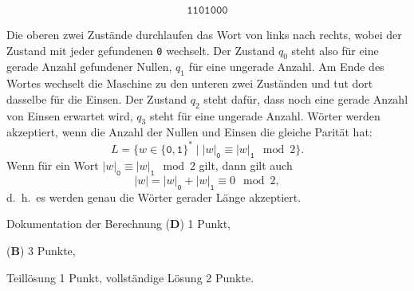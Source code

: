 \begin{loesung}
\begin{teilaufgaben}
\begin{align*}
{\texttt{1101000}
}
\end{align*}
\item
Die oberen zwei Zustände durchlaufen das Wort von links nach rechts,
wobei der Zustand mit jeder gefundenen \texttt{0} wechselt.
Der Zustand $q_0$ steht also für eine gerade Anzahl gefundener Nullen,
$q_1$ für eine ungerade Anzahl.
Am Ende des Wortes wechselt die Maschine zu den unteren zwei Zuständen
und tut dort dasselbe für die Einsen.
Der Zustand $q_2$ steht dafür, dass noch eine gerade Anzahl von Einsen
erwartet wird, $q_3$ steht für eine ungerade Anzahl.
Wörter werden akzeptiert, wenn die Anzahl der Nullen und Einsen die 
gleiche Parität hat:
\[
L = \{ w\in\{\texttt{0},\texttt{1}\}^* \mid
|w|_{\texttt{0}}
\equiv
|w|_{\texttt{1}}
\mod 2\}.
\]
Wenn für ein Wort $|w|_{\texttt{0}}\equiv |w|_{\texttt{1}}\mod 2$ gilt, dann gilt
auch 
\[
|w|
=
|w|_{\texttt{0}} + |w|_{\texttt{1}} \equiv 0\mod 2,
\]
d.~h.~es werden genau die Wörter gerader Länge akzeptiert.
\qedhere
\end{teilaufgaben}
\end{loesung}

\begin{bewertung}
\begin{teilaufgaben}
\item Dokumentation der Berechnung ({\bf D}) 1 Punkt,
\item ({\bf B}) 3 Punkte,
\item Teillösung 1 Punkt, vollständige Lösung 2 Punkte.
\end{teilaufgaben}
\end{bewertung}


